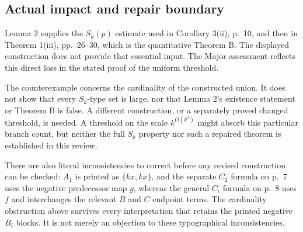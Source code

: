 \documentclass[10pt]{article}
\begin{document}
\subsection*{Actual impact and repair boundary}
Lemma 2 supplies the \(S_k(p)\) estimate used in Corollary 3(ii), p. 10, and then in Theorem 1(iii), pp. 26–30, which is the quantitative Theorem B. The displayed construction does not provide that essential input. The Major assessment reflects this direct loss in the stated proof of the uniform threshold.\par
The counterexample concerns the cardinality of the constructed union. It does not show that every \(S_k\)-type set is large, nor that Lemma 2’s existence statement or Theorem B is false. A different construction, or a separately proved changed threshold, is needed. A threshold on the scale \(k^{O(k^2)}\) might absorb this particular branch count, but neither the full \(S_k\) property nor such a repaired theorem is established in this review.\par
There are also literal inconsistencies to correct before any revised construction can be checked: \(A_1\) is printed as \(\{kx,kx\}\), and the separate \(C_2\) formula on p. 7 uses the negative predecessor map \(g\), whereas the general \(C_i\) formula on p. 8 uses \(f\) and interchanges the relevant \(B\) and \(C\) endpoint terms. The cardinality obstruction above survives every interpretation that retains the printed negative \(B_i\) blocks. It is not merely an objection to these typographical inconsistencies.\par
\end{document}
